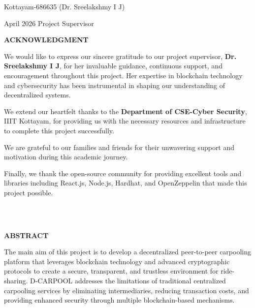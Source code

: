 \documentclass[12pt]{report}
\theoremstyle{plain}
\theoremstyle{definition}
\theoremstyle{remark}
\begin{document}
\vspace{4cm}

\noindent Kottayam-686635 \hfill (Dr. Sreelakshmy I J)

\noindent April 2026 \hfill Project Supervisor

\clearpage

\begin{center}
{\large{\bf{ACKNOWLEDGMENT}}}
\end{center}

\noindent We would like to express our sincere gratitude to our project supervisor, \textbf{Dr. Sreelakshmy I J}, for her invaluable guidance, continuous support, and encouragement throughout this project. Her expertise in blockchain technology and cybersecurity has been instrumental in shaping our understanding of decentralized systems.

\noindent We extend our heartfelt thanks to the \textbf{Department of CSE-Cyber Security}, IIIT Kottayam, for providing us with the necessary resources and infrastructure to complete this project successfully.

\noindent We are grateful to our families and friends for their unwavering support and motivation during this academic journey.

\noindent Finally, we thank the open-source community for providing excellent tools and libraries including React.js, Node.js, Hardhat, and OpenZeppelin that made this project possible.

\vspace{4cm}
\hspace*{\fill}{\large G. Sai Vivek Reddy (Roll No. 2022BCY0028)}\\
\hspace*{\fill}{\large Sarthak Gupta (Roll No. 2022BCY0054)}\\
\hspace*{\fill}{\large Hisham Abdul Asis KV (Roll No. 2022BCY0001)}

\clearpage

\begin{center}
{\Large{\bf{ABSTRACT}}
}
\end{center}

The main aim of this project is to develop a decentralized peer-to-peer carpooling platform that leverages blockchain technology and advanced cryptographic protocols to create a secure, transparent, and trustless environment for ride-sharing. D-CARPOOL addresses the limitations of traditional centralized carpooling services by eliminating intermediaries, reducing transaction costs, and providing enhanced security through multiple blockchain-based mechanisms.
\end{document}
